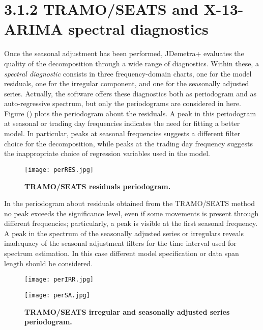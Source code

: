 \documentclass{article}
\begin{document}
\section*{\small 3.1.2 TRAMO/SEATS and X-13-ARIMA spectral diagnostics}
Once the seasonal adjustment has been performed, JDemetra+ evaluates the quality of the decomposition through a wide range of diagnostics. Within these, a \textit{spectral diagnostic} consists in three frequency-domain charts, one for the model residuals, one for the irregular component, and one for the seasonally adjusted series. Actually, the software offers these diagnostics both as periodogram and as auto-regressive spectrum, but only the periodograms are considered in here. Figure () plots the periodogram about the residuals. A peak in this periodogram at seasonal or trading day frequencies indicates the need for fitting a better model. In particular, peaks at seasonal frequencies suggests a different filter choice for the decomposition, while peaks at the trading day frequency suggests the inappropriate choice of regression variables used in the model.
\begin{figure}[H]
  \texttt{[image: perRES.jpg]}
  \caption{\textbf{\footnotesize TRAMO/SEATS residuals periodogram.}}
  \label{fig:1}
\end{figure}
In the periodogram about residuals obtained from the TRAMO/SEATS method no peak exceeds the significance level, even if some movements is present through different frequencies; particularly, a peak is visible at the first seasonal frequency. A peak in the spectrum of the seasonally adjusted series or irregulars reveals inadequacy of the seasonal adjustment filters for the time interval used for spectrum estimation. In this case different model specification or data span length should be considered.
\begin{figure}[H]
  \texttt{[image: perIRR.jpg]}
  \label{fig:1}
\end{figure}
\begin{figure}[H]
  \texttt{[image: perSA.jpg]}
  \caption{\textbf{\footnotesize TRAMO/SEATS irregular and seasonally adjusted series periodogram. }}
  \label{fig:1}
\end{figure}
\end{document}

